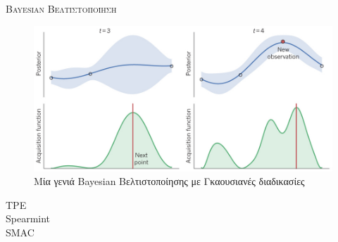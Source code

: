 \documentclass{beamer}
\begin{document}
  \begin{frame}{ \scshape Bayesian Βελτιστοποίηση}
  	\begin{minipage}[t]{0.7\textwidth}
  	\begin{figure}
  		\includegraphics[width=\textwidth]{bayes}
  		\caption{Μία γενιά Bayesian Βελτιστοποίησης με Γκαουσιανές διαδικασίες}
  	\end{figure}
  \end{minipage} \hspace{0.5cm}
  	\begin{minipage}[t]{0.2\textwidth}
  		\centering
  		TPE
  		\\ \vspace{1cm}
  		Spearmint
  		\\ \vspace{1cm}
  		SMAC
  	\end{minipage}
  \end{frame}
\end{document}
